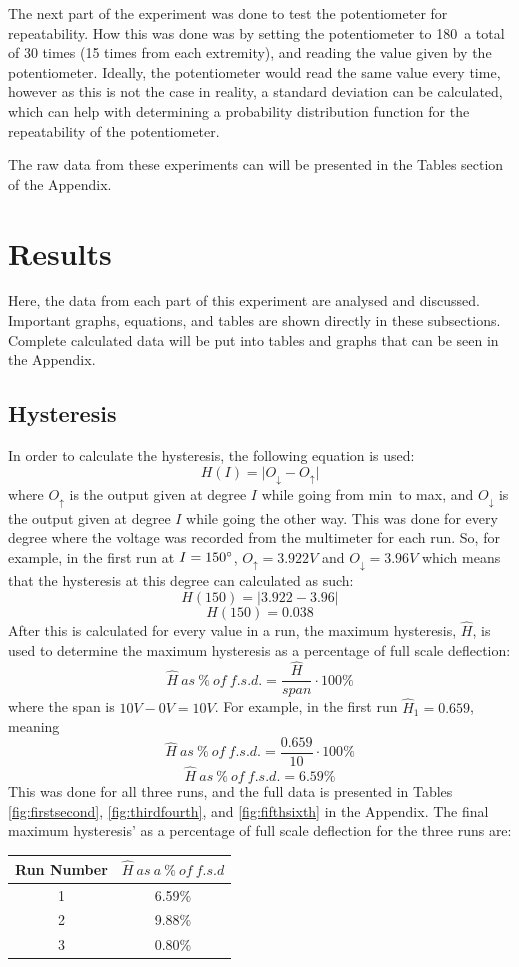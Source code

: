 \documentclass[a4,11pt]{article}
\begin{document}
The next part of the experiment was done to test the potentiometer for repeatability. How this was done was by setting the potentiometer to 180\degree\ a total of 30 times (15 times from each extremity), and reading the value given by the potentiometer. Ideally, the potentiometer would read the same value every time, however as this is not the case in reality, a standard deviation can be calculated, which can help with determining a probability distribution function for the repeatability of the potentiometer.

The raw data from these experiments can will be presented in the Tables section of the Appendix.
\section{Results}
Here, the data from each part of this experiment are analysed and discussed. Important graphs, equations, and tables are shown directly in these subsections. Complete calculated data will be put into tables and graphs that can be seen in the Appendix.
\subsection{Hysteresis}
In order to calculate the hysteresis, the following equation is used:
$$H(I)=\lvert O_\downarrow-O_\uparrow\rvert$$
where $O_\uparrow$ is the output given at degree $I$ while going from min\degree\ to max\degree, and $O_\downarrow$ is the output given at degree $I$ while going the other way. This was done for every degree where the voltage was recorded from the multimeter for each run. So, for example, in the first run at $I=150\degree$, $O_\uparrow=3.922V$ and $O_\downarrow=3.96V$ which means that the hysteresis at this degree can calculated as such:
$$H(150)=\lvert 3.922-3.96\rvert$$
$$H(150)=0.038$$
After this is calculated for every value in a run, the maximum hysteresis, $\hat{H}$, is used to determine the maximum hysteresis as a percentage of full scale deflection:
$$\hat{H}\ as\ \%\ of\ f.s.d.=\frac{\hat{H}}{span}\cdot 100\%$$
where the span is $10V-0V=10V$. For example, in the first run $\hat{H}_1=0.659$, meaning
$$\hat{H}\ as\ \%\ of\ f.s.d.=\frac{0.659}{10}\cdot 100\%$$
$$\hat{H}\ as\ \%\ of\ f.s.d.=6.59\%$$
This was done for all three runs, and the full data is presented in Tables \ref{fig:firstsecond}, \ref{fig:thirdfourth}, and \ref{fig:fifthsixth} in the Appendix. The final maximum hysteresis' as a percentage of full scale deflection for the three runs are:
\begin{center}
	\begin{tabular}{c|c}
		Run Number & $\hat{H}\ as\ a\ \%\ of\ f.s.d$ \\
		\hline
		1 & 6.59\% \\
		2 & 9.88\% \\
		3 & 0.80\% \\
		\hline
	\end{tabular}
\end{center}
\end{document}
